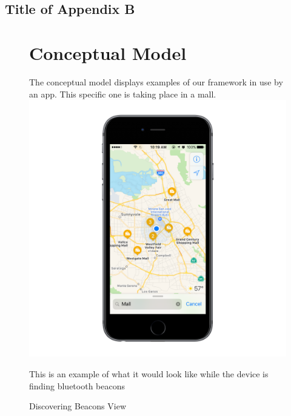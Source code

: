 \section{\\Title of Appendix B}

\begin{figure}
\chapter{Conceptual Model}
The conceptual model displays examples of our framework in use by an app. This specific one is taking place in a mall.
\newline
\includegraphics[width=1\textwidth]{images/con1.png}
\caption{Discovering Beacons View}
This is an example of what it would look like while the device is finding bluetooth beacons
\end{figure}
